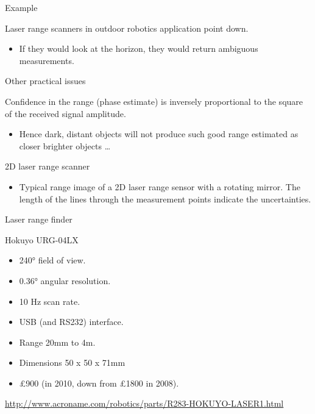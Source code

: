 \documentclass[compress]{beamer}
\providecommand{\tightlist}{%
  \setlength{\itemsep}{0pt}\setlength{\parskip}{0pt}}
\begin{document}
\begin{frame}{Example}

Laser range scanners in outdoor robotics application point down.

\begin{itemize}
\tightlist
\item
  If they would look at the horizon, they would return ambiguous
  measurements.
\end{itemize}

\end{frame}

\begin{frame}{Other practical issues}

Confidence in the range (phase estimate) is inversely proportional to
the square of the received signal amplitude.

\begin{itemize}
\tightlist
\item
  Hence dark, distant objects will not produce such good range estimated
  as closer brighter objects \ldots{}
\end{itemize}

\end{frame}

\begin{frame}{2D laser range scanner}

\begin{itemize}
\tightlist
\item
  Typical range image of a 2D laser range sensor with a rotating mirror.
  The length of the lines through the measurement points indicate the
  uncertainties.
\end{itemize}

\end{frame}

\begin{frame}{Laser range finder}

Hokuyo URG-04LX

\begin{itemize}
\tightlist
\item
  240° field of view.
\item
  0.36° angular resolution.
\item
  10 Hz scan rate.
\item
  USB (and RS232) interface.
\item
  Range 20mm to 4m.
\item
  Dimensions 50 x 50 x 71mm
\item
  £900 (in 2010, down from £1800 in 2008).
\end{itemize}

\url{http://www.acroname.com/robotics/parts/R283-HOKUYO-LASER1.html}

\end{frame}
\end{document}
